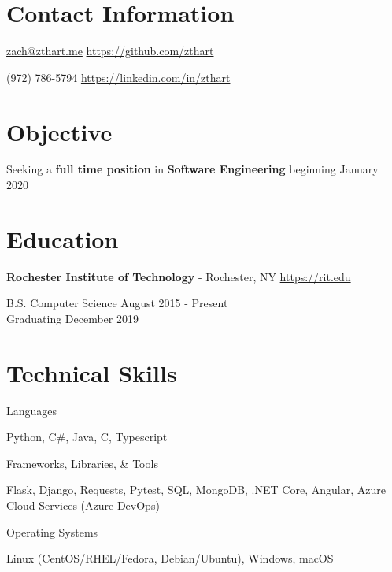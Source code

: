 \documentclass[margin,line]{resume}
\newcommand{\rurl}[1]{\hfill {\footnotesize \url{#1}}}
\newcommand{\rdate}[1]{\hfill {\small #1}}
\begin{document}

\begin{resume}
\section{\mysidestyle Contact Information}
	\begin{asparablank}
		\item \href{mailto:zach@zthart.me}{zach@zthart.me} \rurl{https://github.com/zthart}
		\item (972) 786-5794 \rurl{https://linkedin.com/in/zthart}
    	\end{asparablank}

\section{\mysidestyle Objective}
	\begin{asparablank}
	\item Seeking a \textbf{full time position} in \textbf{Software Engineering} beginning January 2020
        \normalsize
	\end{asparablank}

\section{\mysidestyle Education}
	\begin{asparablank}
	\item{\bf Rochester Institute of Technology} - Rochester, NY \rurl{https://rit.edu}
		\small \item B.S. Computer Science \rdate{August 2015 - Present} \\
	
		\small Graduating December 2019
	\end{asparablank}

\section{\mysidestyle Technical Skills}
	\begin{compactdesc}
		\item[Languages] \begin{inparaenum} { \small
			Python, C\#, Java, C, Typescript
		} \end{inparaenum}
        \item[Frameworks, Libraries, \& Tools] \begin{inparaenum} { \small
			Flask, Django, Requests, Pytest, SQL, MongoDB, .NET Core, Angular, Azure Cloud Services (Azure DevOps)
        } \end{inparaenum}
		\item[Operating Systems] \begin{inparaenum} { \small
			Linux (CentOS/RHEL/Fedora, Debian/Ubuntu), Windows, macOS
		} \end{inparaenum}
        \normalsize
	\end{compactdesc}


\end{resume}
\end{document}

